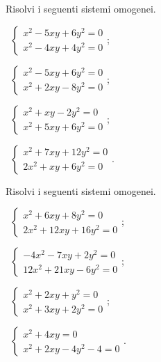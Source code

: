 \begin{esercizio}[\Ast]
\label{ese:6.37}
Risolvi i seguenti sistemi omogenei.
\begin{multicols}{2}
 \begin{enumeratea}
 \item~$\left\{\begin{array}{l}x^2-5xy+6y^2=0\\x^2-4xy+4y^2=0\end{array}\right.$;
 \item~$\left\{\begin{array}{l}x^2-5xy+6y^2=0\\x^2+2xy-8y^2=0\end{array}\right.$;
 \item~$\left\{\begin{array}{l}x^2+xy-2y^2=0\\x^2+5xy+6y^2=0\end{array}\right.$;
 \item~$\left\{\begin{array}{l}x^2+7xy+12y^2=0\\2x^2+xy+6y^2=0\end{array}\right.$.
 \end{enumeratea}
\end{multicols}
\end{esercizio}

\begin{esercizio}[\Ast]
\label{ese:6.38}
Risolvi i seguenti sistemi omogenei.
\begin{multicols}{2}
 \begin{enumeratea}
 \item~$\left\{\begin{array}{l}x^2+6xy+8y^2=0\\2x^2+12xy+16y^2=0\end{array}\right.$;
 \item~$\left\{\begin{array}{l}-4x^2-7{xy}+2y^2=0 \\12x^2+21{xy}-6y^2=0 \end{array}\right.$;
 \item~$\left\{\begin{array}{l}x^2+2xy+y^2=0\\x^2+3xy+2y^2=0\end{array}\right.$;
 \item~$\left\{\begin{array}{l}x^2+4xy=0\\x^2+2xy-4y^2-4=0\end{array}\right.$.
 \end{enumeratea}
\end{multicols}
\end{esercizio}

